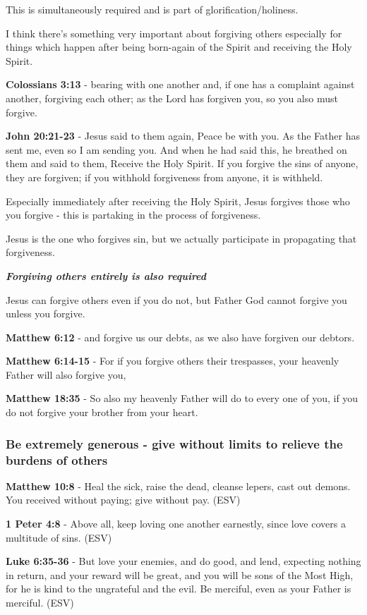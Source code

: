 \documentclass[11pt]{article}
\begin{document}
This is simultaneously required and is part of glorification/holiness.

I think there's something very important about forgiving others especially for things which happen after being born-again of the Spirit and receiving the Holy Spirit.

\textbf{Colossians 3:13} - bearing with one another and, if one has a complaint against another, forgiving each other; as the Lord has forgiven you, so you also must forgive.

\textbf{John 20:21-23} - Jesus said to them again, Peace be with you. As the Father has sent me, even so I am sending you. And when he had said this, he breathed on them and said to them, Receive the Holy Spirit. If you forgive the sins of anyone, they are forgiven; if you withhold forgiveness from anyone, it is withheld.

Especially immediately after receiving the Holy Spirit, Jesus forgives those who you forgive - this is partaking in the process of forgiveness.

Jesus is the one who forgives sin, but we actually participate in propagating that forgiveness.

\emph{\textbf{Forgiving others entirely is also required}}

Jesus can forgive others even if you do not, but Father God cannot forgive you unless you forgive.

\textbf{Matthew 6:12} - and forgive us our debts, as we also have forgiven our debtors.

\textbf{Matthew 6:14-15} - For if you forgive others their trespasses, your heavenly Father will also forgive you,

\textbf{Matthew 18:35} - So also my heavenly Father will do to every one of you, if you do not forgive your brother from your heart.

\subsubsection{Be extremely generous - give without limits to relieve the burdens of others}
\label{sec:orgf25e3fd}
\textbf{Matthew 10:8} - Heal the sick, raise the dead, cleanse lepers, cast out demons. You received without paying; give without pay. (ESV)

\textbf{1 Peter 4:8} - Above all, keep loving one another earnestly, since love covers a multitude of sins. (ESV)

\textbf{Luke 6:35-36} - But love your enemies, and do good, and lend, expecting nothing in return, and your reward will be great, and you will be sons of the Most High, for he is kind to the ungrateful and the evil. Be merciful, even as your Father is merciful. (ESV)
\end{document}
